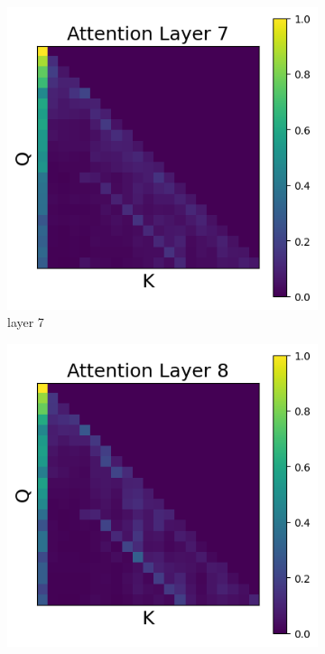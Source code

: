 \documentclass[11pt]{article}
\begin{document}
\begin{figure}[t]
    \begin{subfigure}[t]{0.24\textwidth}
    \centering
    \includegraphics[width=1.4\columnwidth]{figures/intervention5/layer_7.png}
    \caption{layer 7}
  \end{subfigure}\hfill
      \begin{subfigure}[t]{0.24\textwidth}
    \centering
    \includegraphics[width=1.4\columnwidth]{figures/intervention5/layer_8.png}

\end{subfigure}
\end{figure}
\end{document}
